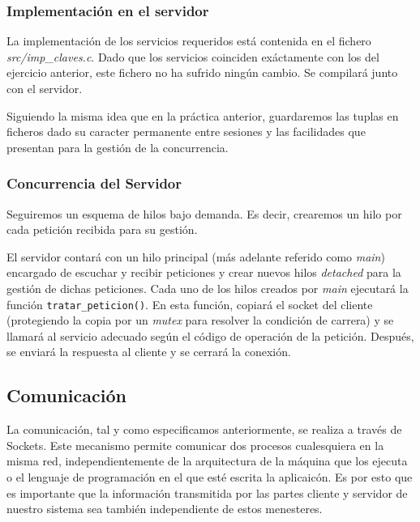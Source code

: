 \documentclass[]{article}
\begin{document}
\subsubsection{Implementación en el servidor}
\label{subsec::implementacion_servidor}

La implementación de los servicios requeridos está contenida en el fichero \textit{src/imp\_claves.c}. Dado que los servicios coinciden exáctamente con los del ejercicio anterior, este fichero no ha sufrido ningún cambio. Se compilará junto con el servidor. 

Siguiendo la misma idea que en la práctica anterior, guardaremos las tuplas en ficheros dado su caracter permanente entre sesiones y las facilidades que presentan para la gestión de la concurrencia.

\subsubsection{Concurrencia del Servidor}
\label{subsec::concurrencia_servidor}

Seguiremos un esquema de hilos bajo demanda. Es decir, crearemos un hilo por cada petición recibida para su gestión. 

El servidor contará con un hilo principal (más adelante referido como \textit{main}) encargado de escuchar y recibir peticiones y crear nuevos hilos \textit{detached} para la gestión de dichas peticiones. 
Cada uno de los hilos creados por \textit{main} ejecutará la función \texttt{tratar\_peticion()}. En esta función, copiará el socket del cliente (protegiendo la copia por un \textit{mutex} para resolver la condición de carrera) y se llamará al servicio adecuado según el código de operación de la petición. Después, se enviará la respuesta al cliente y se cerrará la conexión. 

\subsection{Comunicación}
\label{subsec:comunicacion}
La comunicación, tal y como especificamos anteriormente, se realiza a través de Sockets. Este mecanismo permite comunicar dos procesos cualesquiera en la misma red, independientemente de la arquitectura de la máquina que los ejecuta o el lenguaje de programación en el que esté escrita la aplicaicón. Es por esto que es importante que la información transmitida por las partes cliente y servidor de nuestro sistema sea también independiente de estos menesteres. 
\end{document}

